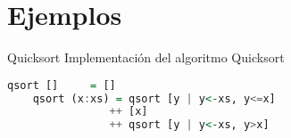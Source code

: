 \section{Ejemplos}

\begin{frame}[fragile]{Quicksort}
  Implementación del algoritmo Quicksort
  \begin{lstlisting}[language=haskell]
    qsort []     = []
    qsort (x:xs) = qsort [y | y<-xs, y<=x]
                ++ [x]
                ++ qsort [y | y<-xs, y>x]
  \end{lstlisting}
\end{frame}
